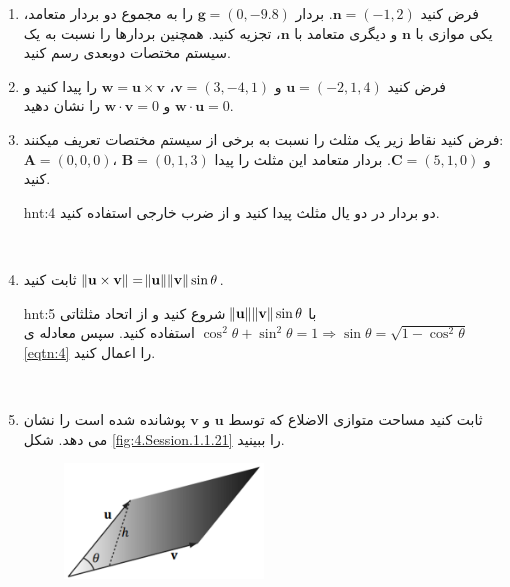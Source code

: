 {\begin{spacing}{1.5}
\begin{enumerate}[label=\textbf{\arabic*}.]
\begin{hint}{hnt:3}
            \end{hint}
            \\
            \item {فرض کنید $\textbf{n}=(-1,2)$. بردار $\textbf{g}=(0,-9.8)$ را به مجموع دو بردار متعامد، یکی موازی با $\textbf{n}$ و دیگری متعامد با $\textbf{n}$، تجزیه کنید. همچنین بردارها را نسبت به یک سیستم مختصات دوبعدی رسم کنید.}
            \\
            \item {فرض کنید $\textbf{u}=(-2,1,4)$ و $\textbf{v}=(3,-4,1)$، $\textbf{w}=\textbf{u}\times\textbf{v}$ را پیدا کنید و $\textbf{w}\cdot\textbf{u}=0$ و $\textbf{w}\cdot\textbf{v}=0$ را نشان دهید.}
            \\
            \item {فرض کنید نقاط زیر یک مثلث را نسبت به برخی از سیستم مختصات تعریف میکنند:\\
                $\textbf{A}=(0,0,0)$، $\textbf{B}=(0,1,3)$ و $\textbf{C}=(5,1,0)$. بردار متعامد این مثلث را پیدا کنید.}
            \begin{hint}{hnt:4}
                \Large
                دو بردار در دو یال مثلث پیدا کنید و از ضرب خارجی استفاده کنید.
            \end{hint}
            \\
            \item \label{question14} {ثابت کنید $\norm{\textbf{u}\times\textbf{v}}=\norm{\textbf{u}}\norm{\textbf{v}}\sin\theta$.}
            \begin{hint}{hnt:5}
                \Large
                با $\norm{\textbf{u}}\norm{\textbf{v}}\sin\theta$ شروع کنید و از اتحاد مثلثاتی $\cos^2\theta+\sin^2\theta=1\Longrightarrow\sin\theta=\sqrt{\displaystyle 1-\cos^2\theta}$ استفاده کنید. سپس معادله ی \ref{eqtn:4} را اعمال کنید.
            \end{hint}
            \\
            \item {ثابت کنید  مساحت متوازی الاضلاع که توسط $\textbf{u}$ و $\textbf{v}$ پوشانده شده است را نشان می دهد. شکل \ref{fig:4.Session.1.1.21} را ببینید.}
            \begin{figure}[H]
                \centering
                \setlength{\belowcaptionskip}{-10pt}
                \includegraphics[width=0.5\textwidth]{Images/4/4.Session.1.1.21}

\end{figure}
\end{enumerate}
\end{spacing}}
